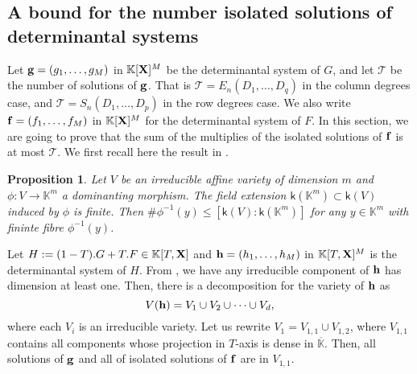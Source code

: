 \documentclass[11pt]{article}
\numberwithin{Property}{section}
\numberwithin{Theorem}{section}
\newtheorem{Proposition}{Proposition}%
\numberwithin{Proposition}{section}
\numberwithin{Lemma}{section}
\numberwithin{Corollary}{section}
\numberwithin{Definition}{section}
\numberwithin{Remark}{section}
\numberwithin{Conjecture}{section}
\numberwithin{Problem}{section}
\numberwithin{Claim}{section}
\theoremstyle{definition}
\numberwithin{Example}{section}
\renewcommand{\leq}{\leqslant}
\def\bar{\overline}
\newcommand{\field}{\mathbb{K}} %
\newcommand{\mat}[1]{\mathbf{\MakeUppercase{#1}}} %
\begin{document}
\newpage

\subsection{A bound for the number isolated solutions of determinantal systems}
\label{subsec:bounddegree}
Let ${\bf g} = (g_1, \ldots, g_M)$ in $\field[\mat{X}]^M$ be the determinantal system of $G$, and let $\mathcal{T}$ be the number of solutions of ${\bf g}$. That is $\mathcal{T} = E_{n}(D_1, \ldots, D_q)$ in the column degrees case, and $\mathcal{T} = S_{n}(D_1, \ldots, D_p)$ in the row degrees case. We also write ${\bf f} = (f_1, \ldots, f_M)$ in $\field[\mat{X}]^M$ for the determinantal system of $F$. In this section, we are going to prove that the sum of the multiplies of the isolated solutions of ${\bf f}$ is at most $\mathcal{T}$. We first recall here the result in \cite[Proposition~1]{Hen83}. 
\begin{Proposition}\label{hen} Let $V$ be an irreducible affine variety of dimension $m$ and $\phi: V \to \field^m$ a dominanting morphism. The field extension $\mathsf{k}(\field^m) \subset \mathsf{k}(V)$ induced by $\phi$ is finite. Then $\#\phi^{-1}(y) \leq [ \mathsf{k}(V) : \mathsf{k}(\field^m)]$ for any $y \in \field^m$ with fininte fibre $\phi^{-1}(y)$.
\end{Proposition}

Let $H := (1-T).G + T.F \in \field[T, \mat{X}]$ and ${\bf h} = (h_1, \ldots, h_M)$ in $\field[T, \mat{X}]^M$ is the determinantal system of $H$. From \cite[Section~6]{Eagon188}, we have any irreducible component of ${\bf h}$ has dimension at least one. Then, there is a decomposition for the variety of ${\bf h}$ as 
\[
V({\bf h}) = V_1 \cup V_2 \cup \cdots \cup V_d, \] where each $V_i$
is an irreducible variety. Let us rewrite $V_1 = V_{1,1} \cup V_{1,2}$, where $V_{1,1}$ contains all components whose projection in $T$-axis is dense in $\bar{\field}$. Then, all solutions of ${\bf g}$ and all of isolated solutions of ${\bf f}$ are in $V_{1,1}$. 
\end{document}
